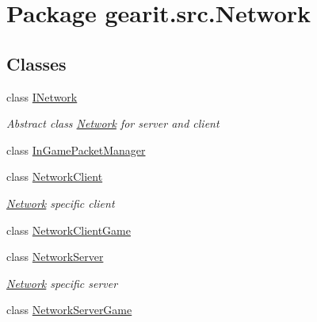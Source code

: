 \hypertarget{namespacegearit_1_1src_1_1_network}{\section{Package gearit.\+src.\+Network}
\label{namespacegearit_1_1src_1_1_network}
}
\subsection*{Classes}
\begin{DoxyCompactItemize}
\item 
class \hyperlink{classgearit_1_1src_1_1_network_1_1_i_network}{I\+Network}
\begin{DoxyCompactList}\small\item\em Abstract class \hyperlink{namespacegearit_1_1src_1_1_network}{Network} for server and client \end{DoxyCompactList}\item 
class \hyperlink{classgearit_1_1src_1_1_network_1_1_in_game_packet_manager}{In\+Game\+Packet\+Manager}
\item 
class \hyperlink{classgearit_1_1src_1_1_network_1_1_network_client}{Network\+Client}
\begin{DoxyCompactList}\small\item\em \hyperlink{namespacegearit_1_1src_1_1_network}{Network} specific client \end{DoxyCompactList}\item 
class \hyperlink{classgearit_1_1src_1_1_network_1_1_network_client_game}{Network\+Client\+Game}
\item 
class \hyperlink{classgearit_1_1src_1_1_network_1_1_network_server}{Network\+Server}
\begin{DoxyCompactList}\small\item\em \hyperlink{namespacegearit_1_1src_1_1_network}{Network} specific server \end{DoxyCompactList}\item 
class \hyperlink{classgearit_1_1src_1_1_network_1_1_network_server_game}{Network\+Server\+Game}
\end{DoxyCompactItemize}
